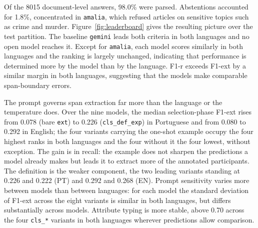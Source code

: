 \documentclass[extendedabs]{recpad2k}
\newcommand{\ubk}{\_\allowbreak}
\begin{document}
Of the 8015 document-level answers, 98.0\% were parsed. Abstentions accounted for 1.8\%, concentrated in \texttt{amalia}, which refused articles on sensitive topics such as crime and murder. Figure~\ref{fig:leaderboard} gives the resulting picture over the test partition. The baseline \texttt{gemini} leads both criteria in both languages and no open model reaches it. Except for \texttt{amalia}, each model scores similarly in both languages and the ranking is largely unchanged, indicating that performance is determined more by the model than by the language. F1-r exceeds F1-ext by a similar margin in both languages, suggesting that the models make comparable span-boundary errors.

The prompt governs span extraction far more than the language or the temperature does. Over the nine models, the median selection-phase F1-ext rises from 0.078 (bare \texttt{ext}) to 0.226 (\texttt{cls\ubk{}def\ubk{}exp}) in Portuguese and from 0.080 to 0.292 in English; the four variants carrying the one-shot example occupy the four highest ranks in both languages and the four without it the four lowest, without exception. The gain is in recall: the example does not sharpen the predictions a model already makes but leads it to extract more of the annotated participants. The definition is the weaker component, the two leading variants standing at 0.226 and 0.222 (PT) and 0.292 and 0.268 (EN). Prompt sensitivity varies more between models than between languages: for each model the standard deviation of F1-ext across the eight variants is similar in both languages, but differs substantially across models. Attribute typing is more stable, above 0.70 across the four \texttt{cls\ubk{}*} variants in both languages wherever predictions allow comparison.
\end{document}
